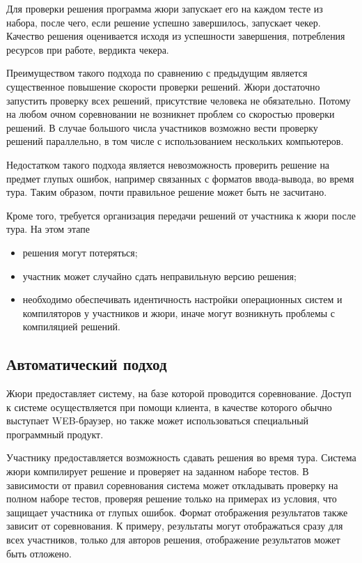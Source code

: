 Для проверки решения программа жюри запускает его на каждом тесте
из набора, после чего, если решение успешно завершилось, запускает чекер.
Качество решения оценивается исходя из успешности завершения, потребления ресурсов при работе,
вердикта чекера.

Преимуществом такого подхода по сравнению с предыдущим является существенное повышение скорости
проверки решений. Жюри достаточно запустить проверку всех решений,
присутствие человека не обязательно. Потому на любом очном соревновании не возникнет
проблем со скоростью проверки решений. В случае большого числа участников возможно вести проверку
решений параллельно, в том числе с использованием нескольких компьютеров.

Недостатком такого подхода является невозможность проверить решение на предмет глупых ошибок,
например связанных с форматов ввода-вывода, во время тура. Таким образом,
почти правильное решение может быть не засчитано.

Кроме того, требуется организация передачи решений от участника к жюри после тура.
На этом этапе
\begin{itemize}
    \item решения могут потеряться;
    \item участник может случайно сдать неправильную версию решения;
    \item необходимо обеспечивать идентичность настройки операционных систем и компиляторов
        у участников и жюри, иначе могут возникнуть проблемы с компиляцией решений.
\end{itemize}

\subsection{Автоматический подход}
Жюри предоставляет систему, на базе которой проводится соревнование.
Доступ к системе осуществляется при помощи клиента, в качестве которого
обычно выступает WEB-браузер, но также может использоваться специальный программный продукт.

Участнику предоставляется возможность сдавать решения во время тура. Система жюри
компилирует решение и проверяет на заданном наборе тестов.
В зависимости от правил соревнования система может откладывать проверку на полном наборе тестов,
проверяя решение только на примерах из условия, что защищает участника от глупых ошибок.
Формат отображения результатов также зависит от соревнования. К примеру, результаты
могут отображаться сразу для всех участников, только для авторов решения, отображение результатов
может быть отложено.

